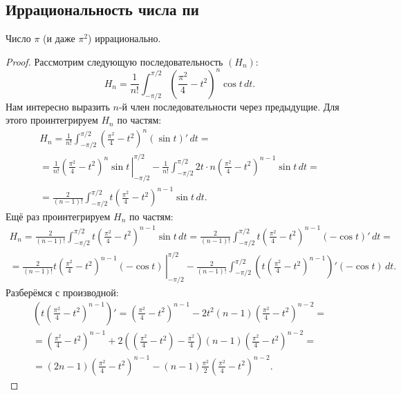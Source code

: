 \subsection{Иррациональность числа пи}

\begin{theorem}
	Число \(\pi\) (и даже \(\pi^2\)) иррационально.
\end{theorem}
\begin{proof}
	Рассмотрим следующую последовательность \((H_n)\): \[
		H_n = \frac{1}{n!} \int_{-\pi/2}^{\pi/2} \left(\frac{\pi^2}4 - t^2 \right)^n \cos t \, dt.
	\]
	Нам интересно выразить \(n\)-й член последовательности через предыдущие. Для этого проинтегрируем \(H_n\) по частям:
	\begin{multline*}
		H_n = \frac{1}{n!} \int_{-\pi/2}^{\pi/2} \left(\frac{\pi^2}4 - t^2 \right)^n (\sin t)' \, dt = \\
		= \left. \frac{1}{n!} \left(\frac{\pi^2}4 - t^2 \right)^n \sin t \, \right|_{-\pi/2}^{\pi/2} 
		- \frac{1}{n!} \int_{-\pi/2}^{\pi/2} 2t \cdot n \left(\frac{\pi^2}{4} - t^2 \right)^{n-1} \sin t \, dt = \\
		= \frac{2}{(n-1)!} \int_{-\pi/2}^{\pi/2} t \left(\frac{\pi^2}{4} - t^2 \right)^{n-1} \sin t \, dt.
	\end{multline*}
	Ещё раз проинтегрируем \(H_n\) по частям:
	\begin{multline*}
		H_n = \frac{2}{(n-1)!} \int_{-\pi/2}^{\pi/2} t \left(\frac{\pi^2}{4} - t^2 \right)^{n-1} \sin t \, dt = \frac{2}{(n-1)!} \int_{-\pi/2}^{\pi/2} t \left(\frac{\pi^2}{4} - t^2 \right)^{n-1} (-\cos t)' \, dt = \\
		= \frac{2}{(n-1)!} \left. t \left(\frac{\pi^2}{4} - t^2 \right)^{n-1} (-\cos t) \, \right|^{\pi/2}_{-\pi/2} - \frac{2}{(n-1)!} \int_{-\pi/2}^{\pi/2} \left(t \left(\frac{\pi^2}{4} - t^2 \right)^{n-1} \right)' (-\cos t) \, dt.
	\end{multline*}
	Разберёмся с производной:
	\begin{multline*}
		\left(t \left(\frac{\pi^2}{4} - t^2 \right)^{n-1} \right)' 
		= \left(\frac{\pi^2}4 - t^2 \right)^{n-1} - 2t^2 (n - 1) \left(\frac{\pi^2}4 - t^2 \right)^{n-2} = \\
		= \left(\frac{\pi^2}4 - t^2 \right)^{n-1} + 2\left(\left(\frac{\pi^2}4 - t^2 \right) - \frac{\pi^2}4 \right) (n - 1) \left(\frac{\pi^2}4 - t^2 \right)^{n-2} = \\
		= (2n - 1) \left(\frac{\pi^2}4 - t^2 \right)^{n-1} - (n - 1) \frac{\pi^2}2 \left(\frac{\pi^2}4 - t^2 \right)^{n-2}.
	\end{multline*}

\end{proof}
